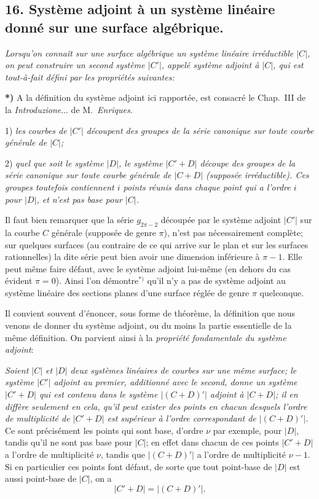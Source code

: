 \documentclass{article}
\begin{document}
\subsection*{16. Système adjoint à un système linéaire donné sur une surface algébrique.}

\emph{Lorsqu'on connaît sur une surface algébrique un système linéaire irréductible $|C|$, on peut construire un second système $|C'|$, appelé système adjoint à $|C|$, qui est tout-à-fait défini par les propriétés suivantes:}

\textbf{*)} A la définition du système adjoint ici rapportée, est consacré le Chap.\ III de la \emph{Introduzione}... de M.\ \emph{Enriques}.


1) \emph{les courbes de $|C'|$ découpent des groupes de la série canonique sur toute courbe générale de $|C|$;}

2) \emph{quel que soit le système $|D|$, le système $|C' + D|$ découpe des groupes de la série canonique sur toute courbe générale de $|C + D|$ (supposée irréductible). Ces groupes toutefois contiennent $i$ points réunis dans chaque point qui a l'ordre $i$ pour $|D|$, et n'est pas base pour $|C|$.}

Il faut bien remarquer que la série $g_{2\pi-2}$ découpée par le système adjoint $|C'|$ sur la courbe $C$ générale (supposée de genre $\pi$), n'est pas nécessairement complète; sur quelques surfaces (au contraire de ce qui arrive sur le plan et sur les surfaces rationnelles) la dite série peut bien avoir une dimension inférieure à $\pi - 1$. Elle peut même faire défaut, avec le système adjoint lui-même (en dehors du cas évident $\pi = 0$). Ainsi l'on démontre${}^{*)}$ qu'il n'y a pas de système adjoint au système linéaire des sections planes d'une surface réglée de genre $\pi$ quelconque.

Il convient souvent d'énoncer, sous forme de théorème, la définition que nous venons de donner du système adjoint, ou du moins la partie essentielle de la même définition. On parvient ainsi à la \emph{propriété fondamentale du système adjoint}:

\emph{Soient $|C|$ et $|D|$ deux systèmes linéaires de courbes sur une même surface; le système $|C'|$ adjoint au premier, additionné avec le second, donne un système $|C' + D|$ qui est contenu dans le système $|(C + D)'|$ adjoint à $|C + D|$; il en diffère seulement en cela, qu'il peut exister des points en chacun desquels l'ordre de multiplicité de $|C' + D|$ est supérieur à l'ordre correspondant de $|(C + D)'|$.} Ce sont précisément les points qui sont base, d'ordre $\nu$ par exemple, pour $|D|$, tandis qu'il ne sont pas base pour $|C|$; en effet dans chacun de ces points $|C' + D|$ a l'ordre de multiplicité $\nu$, tandis que $|(C + D)'|$ a l'ordre de multiplicité $\nu - 1$. Si en particulier ces points font défaut, de sorte que tout point-base de $|D|$ est aussi point-base de $|C|$, on a
\[
|C' + D| = |(C + D)'|.
\]
\end{document}
